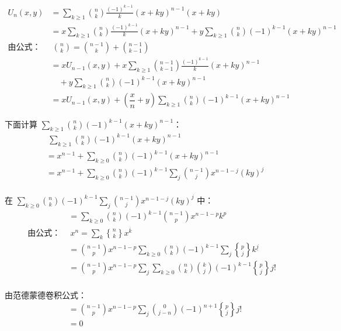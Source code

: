 \begin{align*}
  U_n (x, y) &= \sum_{k \ge 1} \binom{n}{k} \frac{(-1)^{k-1}}{k} (x+ky)^{n-1} (x+ky) \\
  &= x \sum_{k \ge 1} \binom{n}{k} \frac{(-1)^{k-1}}{k} (x+ky)^{n-1} + y \sum_{k \ge 1} \binom{n}{k} (-1)^{k-1} (x+ky)^{n-1} \\
  \text{由公式：} \ & \ \boxed{\binom{n}{k} = \binom{n-1}{k} + \binom{n-1}{k-1}} \\
  &= x U_{n-1} (x, y) + x \sum_{k \ge 1} \binom{n-1}{k-1} \frac{(-1)^{k-1}}{k} (x+ky)^{n-1} \\
  & \quad + y \sum_{k \ge 1} \binom{n}{k} (-1)^{k-1} (x+ky)^{n-1} \\
  &= x U_{n-1} (x, y) + \left( \dfrac{x}{n} + y \right) \sum_{k \ge 1} \binom{n}{k} (-1)^{k-1} (x+ky)^{n-1}
\end{align*}

下面计算 \( \sum_{k \ge 1} \binom{n}{k} (-1)^{k-1} (x+ky)^{n-1} \)：
\begin{align*}
  & \ \sum_{k \ge 1} \binom{n}{k} (-1)^{k-1} (x+ky)^{n-1} \\
  &= x^{n-1} + \sum_{k \ge 0} \binom{n}{k} (-1)^{k-1} (x+ky)^{n-1} \\
  &= x^{n-1} + \sum_{k \ge 0} \binom{n}{k} (-1)^{k-1} \sum_j \binom{n-1}{j} x^{n-1-j} (ky)^j \\
\end{align*}

在 \( \sum_{k \ge 0} \binom{n}{k} (-1)^{k-1} \sum_j \binom{n-1}{j} x^{n-1-j} (ky)^j \) 中：
\begin{align*}
  [y^p] &= \sum_{k \ge 0} \binom{n}{k} (-1)^{k-1} \binom{n-1}{p} x^{n-1-p} k^p \\
  \text{由公式：} \ & \ \boxed{x^n = \sum_k \genfrac{\{}{\}}{0pt}{} {n}{k} x^{\overline{k}}} \\
  &= \binom{n-1}{p} x^{n-1-p} \sum_{k \ge 0} \binom{n}{k} (-1)^{k-1} \sum_j \genfrac{\{}{\}}{0pt}{} {p}{j} k^{\underline{j}} \\
  &= \binom{n-1}{p} x^{n-1-p} \sum_j \sum_{k \ge 0} \binom{n}{k} \binom{k}{j} (-1)^{k-1} \genfrac{\{}{\}}{0pt}{} {p}{j} j! \\
\end{align*}

由范德蒙德卷积公式：
\begin{align*}
  &= \binom{n-1}{p} x^{n-1-p} \sum_j \binom{0}{j-n} (-1)^{n+1} \genfrac{\{}{\}}{0pt}{} {p}{j} j! \\
  &= 0
\end{align*}

